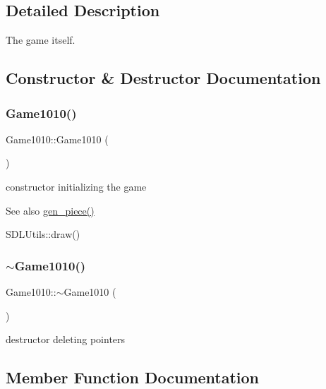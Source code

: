 \subsection{Detailed Description}
The game itself. 

\subsection{Constructor \& Destructor Documentation}
\mbox{\label{class_game1010_a0a0688219844edbe8f4a44c11a13e32a}} 
\subsubsection{\texorpdfstring{Game1010()}{Game1010()}}
{\footnotesize\ttfamily Game1010\+::\+Game1010 (\begin{DoxyParamCaption}{ }\end{DoxyParamCaption})\hspace{0.3cm}{\ttfamily [inline]}}



constructor initializing the game 

\begin{DoxySeeAlso}{See also}
\mbox{\hyperlink{class_game1010_a9576170947a355682c922cb648432b9e}{gen\+\_\+piece()}} 

S\+D\+L\+Utils\+::draw() 
\end{DoxySeeAlso}
\mbox{\label{class_game1010_abcdf29a3fb425ad389e247f241ee4ed5}} 
\subsubsection{\texorpdfstring{$\sim$\+Game1010()}{~Game1010()}}
{\footnotesize\ttfamily Game1010\+::$\sim$\+Game1010 (\begin{DoxyParamCaption}{ }\end{DoxyParamCaption})\hspace{0.3cm}{\ttfamily [inline]}}



destructor deleting pointers 



\subsection{Member Function Documentation}
\mbox{\label{class_game1010_a3bc296b7ba6bffeda3baceb1240190b6}} 
